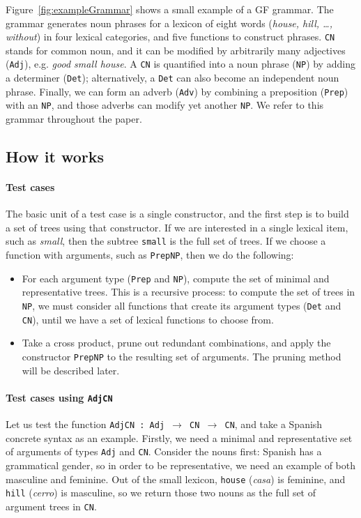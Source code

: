 \documentclass[11pt]{article}
\def\t#1{\texttt{#1}}
\begin{document}
Figure~\ref{fig:exampleGrammar} shows a small example of a GF
grammar. The grammar generates noun phrases for a lexicon of eight words (\emph{house, hill, \dots, without}) in four lexical categories, and five functions to construct phrases. 
\t{CN} stands for common noun, and it can be modified by arbitrarily many adjectives (\t{Adj}), e.g. \emph{good small house}. A \t{CN} is quantified into a noun phrase (\t{NP}) by adding a determiner (\t{Det}); alternatively, a \t{Det} can also become an independent noun phrase. Finally, we can form an adverb (\t{Adv}) by combining a preposition (\t{Prep}) with an \t{NP}, and those adverbs can modify yet another \t{NP}.
We refer to this grammar throughout the paper.

\subsection{How it works}

\paragraph{Test cases} 
The basic unit of a test case is a single constructor, and the first step 
is to build a set of trees using that constructor.
If we are interested in a single lexical item, such as \emph{small}, 
then the subtree \t{small} is the full set of trees. If we choose a function 
with arguments, such as \t{PrepNP}, then we do the following: 
\begin{itemize}
\item For each argument type (\t{Prep} and \t{NP}), compute the
  set of minimal and representative trees. This is a recursive
  process: to compute the set of trees in \t{NP}, we must consider
  all functions that create its argument types (\t{Det} and \t{CN}), until we
  have a set of lexical functions to choose from. 
\item Take a cross product, prune out redundant combinations, and apply the constructor \t{PrepNP} to the resulting set of arguments. The pruning method will be described later.
\end{itemize}

\paragraph{Test cases using \t{AdjCN}} Let us test the function
\t{AdjCN : Adj $\rightarrow$ CN $\rightarrow$ CN}, and take a Spanish concrete syntax as an example.
Firstly, we need a minimal and representative set of arguments of types
\t{Adj} and \t{CN}. Consider the nouns first: Spanish has a grammatical gender, so in order to be representative, we need an example of both masculine and feminine. Out of the small lexicon, \t{house} (\emph{casa}) is feminine, and \t{hill} (\emph{cerro}) is masculine, so we return those two nouns as the full set of argument trees in \t{CN}.
\end{document}
